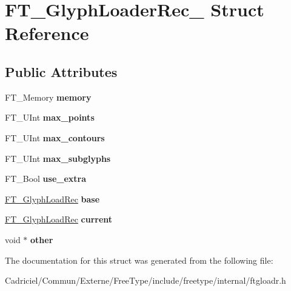 \hypertarget{struct_f_t___glyph_loader_rec__}{}\section{F\+T\+\_\+\+Glyph\+Loader\+Rec\+\_\+ Struct Reference}
\label{struct_f_t___glyph_loader_rec__}
\subsection*{Public Attributes}
\begin{DoxyCompactItemize}
\item 
F\+T\+\_\+\+Memory {\bfseries memory}\hypertarget{struct_f_t___glyph_loader_rec___a9120a7808ee59d24dd52409e609907a2}{}\label{struct_f_t___glyph_loader_rec___a9120a7808ee59d24dd52409e609907a2}

\item 
F\+T\+\_\+\+U\+Int {\bfseries max\+\_\+points}\hypertarget{struct_f_t___glyph_loader_rec___a62339fa7a06e0b4ddecd5db2aa606741}{}\label{struct_f_t___glyph_loader_rec___a62339fa7a06e0b4ddecd5db2aa606741}

\item 
F\+T\+\_\+\+U\+Int {\bfseries max\+\_\+contours}\hypertarget{struct_f_t___glyph_loader_rec___a808ccf46597572d953f387e705f10a36}{}\label{struct_f_t___glyph_loader_rec___a808ccf46597572d953f387e705f10a36}

\item 
F\+T\+\_\+\+U\+Int {\bfseries max\+\_\+subglyphs}\hypertarget{struct_f_t___glyph_loader_rec___a2d5b00d7caf624ed2b4f6fd2db3228db}{}\label{struct_f_t___glyph_loader_rec___a2d5b00d7caf624ed2b4f6fd2db3228db}

\item 
F\+T\+\_\+\+Bool {\bfseries use\+\_\+extra}\hypertarget{struct_f_t___glyph_loader_rec___a54009985acda32d83f2f124e28c5d00a}{}\label{struct_f_t___glyph_loader_rec___a54009985acda32d83f2f124e28c5d00a}

\item 
\hyperlink{struct_f_t___glyph_load_rec__}{F\+T\+\_\+\+Glyph\+Load\+Rec} {\bfseries base}\hypertarget{struct_f_t___glyph_loader_rec___ae80dfc17f20bfce8c60ffaaba95c821b}{}\label{struct_f_t___glyph_loader_rec___ae80dfc17f20bfce8c60ffaaba95c821b}

\item 
\hyperlink{struct_f_t___glyph_load_rec__}{F\+T\+\_\+\+Glyph\+Load\+Rec} {\bfseries current}\hypertarget{struct_f_t___glyph_loader_rec___a271b1b9604746ed08cf6613710ebb4c1}{}\label{struct_f_t___glyph_loader_rec___a271b1b9604746ed08cf6613710ebb4c1}

\item 
void $\ast$ {\bfseries other}\hypertarget{struct_f_t___glyph_loader_rec___a9c58c5b06f0135fe5cef16bd85d939e3}{}\label{struct_f_t___glyph_loader_rec___a9c58c5b06f0135fe5cef16bd85d939e3}

\end{DoxyCompactItemize}


The documentation for this struct was generated from the following file\+:\begin{DoxyCompactItemize}
\item 
Cadriciel/\+Commun/\+Externe/\+Free\+Type/include/freetype/internal/ftgloadr.\+h\end{DoxyCompactItemize}
